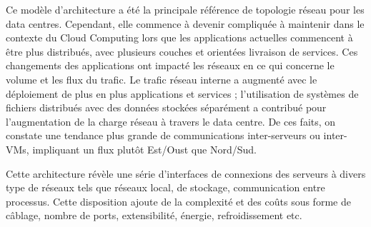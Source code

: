 Ce modèle d'architecture a été la principale référence de topologie réseau pour les data centres. Cependant, elle commence à  devenir compliquée à maintenir dans le contexte du Cloud Computing lors que les applications actuelles commencent à être plus distribués, avec plusieurs couches et orientées livraison de services. Ces changements des applications ont impacté les réseaux en ce qui concerne le volume et les flux du trafic. Le trafic réseau interne a augmenté avec le déploiement de plus en plus applications et services ; l'utilisation de systèmes de fichiers distribués avec des données stockées séparément a contribué pour l'augmentation de la charge réseau à travers le data centre. De ces faits, on constate une tendance plus grande de communications inter-serveurs ou inter-VMs, impliquant un flux plutôt Est/Oust que Nord/Sud.



Cette architecture révèle une série d'interfaces de connexions des serveurs à divers type de réseaux tels que réseaux local, de stockage, communication entre processus. Cette disposition ajoute de la complexité et des coûts sous forme de câblage, nombre de ports, extensibilité, énergie, refroidissement etc. 

